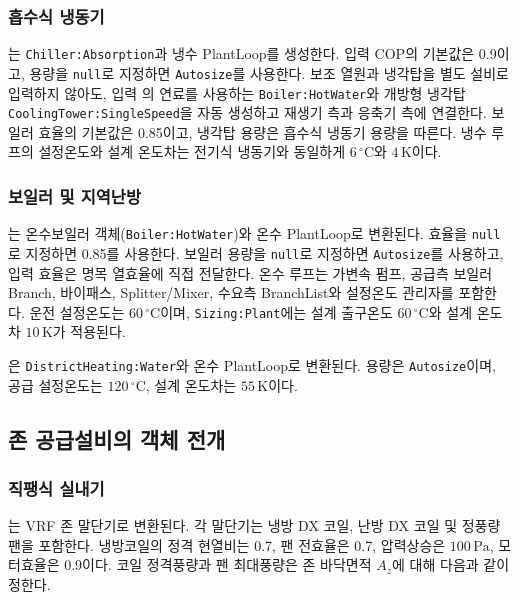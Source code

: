 \subsubsection{흡수식 냉동기}

는 \texttt{Chiller:Absorption}과 냉수 PlantLoop를 생성한다. 입력 COP의 기본값은 0.9이고, 용량을 \texttt{null}로 지정하면 \texttt{Autosize}를 사용한다. 보조 열원과 냉각탑을 별도 설비로 입력하지 않아도, 입력 의 연료를 사용하는 \texttt{Boiler:HotWater}와 개방형 냉각탑 \texttt{CoolingTower:SingleSpeed}을 자동 생성하고 재생기 측과 응축기 측에 연결한다. 보일러 효율의 기본값은 0.85이고, 냉각탑 용량은 흡수식 냉동기 용량을 따른다. 냉수 루프의 설정온도와 설계 온도차는 전기식 냉동기와 동일하게 $6\,^{\circ}\mathrm{C}$와 $4\,\mathrm{K}$이다.

\subsubsection{보일러 및 지역난방}

는 온수보일러 객체(\texttt{Boiler:}\allowbreak\texttt{HotWater})와 온수 PlantLoop로 변환된다. 효율을 \texttt{null}로 지정하면 0.85를 사용한다. 보일러 용량을 \texttt{null}로 지정하면 \texttt{Autosize}를 사용하고, 입력 효율은 명목 열효율에 직접 전달한다. 온수 루프는 가변속 펌프, 공급측 보일러 Branch, 바이패스, Splitter/Mixer, 수요측 BranchList와 설정온도 관리자를 포함한다. 운전 설정온도는 $60\,^{\circ}\mathrm{C}$이며, \texttt{Sizing:Plant}에는 설계 출구온도 $60\,^{\circ}\mathrm{C}$와 설계 온도차 $10\,\mathrm{K}$가 적용된다.

은 \texttt{DistrictHeating:Water}와 온수 PlantLoop로 변환된다. 용량은 \texttt{Autosize}이며, 공급 설정온도는 $120\,^{\circ}\mathrm{C}$, 설계 온도차는 $55\,\mathrm{K}$이다.

\subsection{존 공급설비의 객체 전개}

\subsubsection{직팽식 실내기}

는 VRF 존 말단기로 변환된다. 각 말단기는 냉방 DX 코일, 난방 DX 코일 및 정풍량 팬을 포함한다. 냉방코일의 정격 현열비는 0.7, 팬 전효율은 0.7, 압력상승은 $100\,\mathrm{Pa}$, 모터효율은 0.9이다. 코일 정격풍량과 팬 최대풍량은 존 바닥면적 $A_z$에 대해 다음과 같이 정한다.

